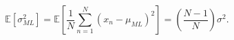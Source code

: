 \begin{equation}
\label{eq:sigma}
\mathbb{E}[\sigma^2_{ML}] = \mathbb{E}\left[\frac{1}{N} \sum_{n = 1}^{N}{(x_n -
\mu_{ML})^2} \right] = \left( \frac{N - 1}{N} \right) \sigma^2.
\end{equation}